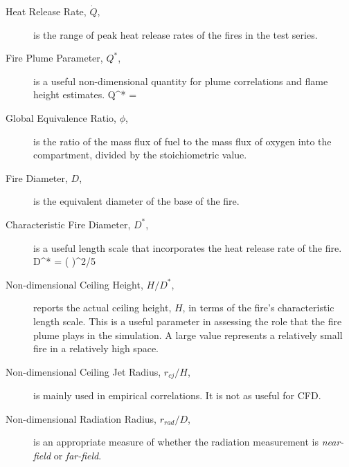 \begin{description}
\item[Heat Release Rate, $\dot{Q}$,] is the range of peak heat release rates of the fires in the test series.
\item[Fire Plume Parameter, $Q^*$,] is a useful non-dimensional quantity for plume correlations and flame height estimates.
\be Q^* =  \ee
\item[Global Equivalence Ratio, $\phi$,] is the ratio of the mass flux of fuel to the mass flux of oxygen into the compartment, divided by the stoichiometric value.
\item[Fire Diameter, $D$,] is the equivalent diameter of the base of the fire. 
\item[Characteristic Fire Diameter, $D^*$,] is a useful length scale that incorporates the heat release rate of the fire.
\be D^* = \left(  \right)^{2/5}  \ee
\item[Non-dimensional Ceiling Height, $H/D^*$,] reports the actual ceiling height, $H$, in terms of the fire's characteristic length scale. This is a useful
parameter in assessing the role that the fire plume plays in the simulation. A large value represents a relatively small fire in a relatively high space.
\item[Non-dimensional Ceiling Jet Radius, $r_{cj}/H$,] is mainly used in empirical correlations. It is not as useful for CFD.
\item[Non-dimensional Radiation Radius, $r_{rad}/D$,] is an appropriate measure of whether the radiation measurement is {\em near-field} or {\em far-field}.
\end{description}


